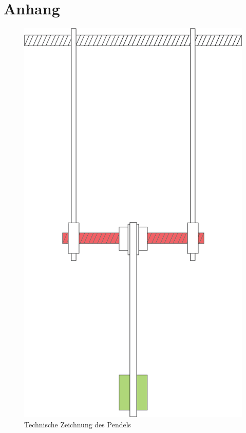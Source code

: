 \section{Anhang}
\nopagebreak
\begin{figure}
	\centering
		\includegraphics[width=.6\textwidth]{images/pendel-skizze.png}
	\caption{Technische Zeichnung des Pendels}
	\label{pic:skizze_versuchsaufbau}
\end{figure}
\lstset{language=Python}
\lstset{inputencoding=utf8/latin1}
\lstset{numbers=left, numberstyle=\tiny, stepnumber=2, numbersep=5pt}

\tiny

